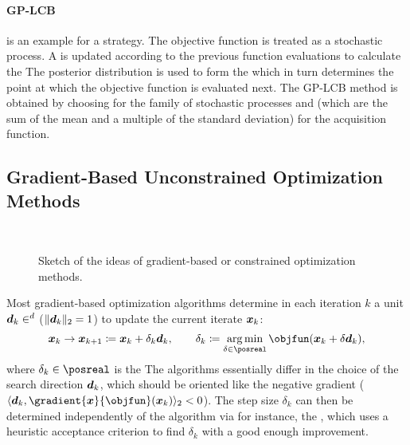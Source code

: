 \paragraph{GP-LCB}

 is an example
for a  strategy.
The objective function is treated as a stochastic process.
A  is updated according to the previous function
evaluations to calculate the 
The posterior distribution is used to form the 
which in turn determines the point at which the objective
function is evaluated next.
The GP-LCB method is obtained by choosing
 for the family of stochastic processes and
 (which are the sum of the mean
and a multiple of the standard deviation) for the acquisition function.



\subsection{Gradient-Based Unconstrained Optimization Methods}
\label{sec:512gradientBasedUnconstrained}

\begin{figure}
  \qquad{}\qquad{}%
  \\[3mm]%
  \quad{}\quad{}%
  \caption[Ideas of various gradient-based optimization methods]{%
    Sketch of the ideas of gradient-based or constrained
    optimization methods.%
  }%
  \label{fig:optimizationMethodGradientBased}%
\end{figure}

Most gradient-based optimization algorithms determine in
each iteration $k$ a unit  $\*d_k \in \real^d$
($\norm[2]{\*d_k} = 1$) to update the current iterate ${\boldsymbol{x}}_k$:
\begin{equation}
  \*x_k
  \to \*x_{k+1}
  \ceq \*x_k + \delta_k \*d_k,\qquad
  \delta_k
  \ceq \argmin_{\delta \in \posreal} \objfun(\*x_k + \delta \*d_k),
\end{equation}
where $\delta_k \in \posreal$ is the 
The algorithms essentially differ in the
choice of the search direction ${\boldsymbol{d}}_k$,
which should be oriented like the negative gradient
($\innerprod[2]{\*d_k}{\gradient{\*x}{\objfun}(\*x_k)} < 0$).
The step size $\delta_k$ can then be determined independently of the
algorithm via 
for instance, the 
,
which uses a heuristic acceptance criterion
to find $\delta_k$ with a good enough improvement.

